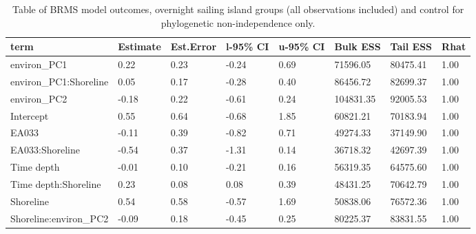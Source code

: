 \begin{table}[ht]
\centering
\begin{tabular}{p{3cm}p{1.35cm}p{1.35cm}p{1.35cm}p{1.35cm}p{1.35cm}p{1.35cm}p{1.35cm}}
  \toprule
term & Estimate & Est.Error & l-95\% CI & u-95\% CI & Bulk ESS & Tail ESS & Rhat \\ 
  \midrule
environ\_PC1 & 0.22 & 0.23 & -0.24 & 0.69 & 71596.05 & 80475.41 & 1.00 \\ 
  environ\_PC1:Shoreline & 0.05 & 0.17 & -0.28 & 0.40 & 86456.72 & 82699.37 & 1.00 \\ 
  environ\_PC2 & -0.18 & 0.22 & -0.61 & 0.24 & 104831.35 & 92005.53 & 1.00 \\ 
  Intercept & 0.55 & 0.64 & -0.68 & 1.85 & 60821.21 & 70183.94 & 1.00 \\ 
  EA033 & -0.11 & 0.39 & -0.82 & 0.71 & 49274.33 & 37149.90 & 1.00 \\ 
  EA033:Shoreline & -0.54 & 0.37 & -1.31 & 0.14 & 36718.32 & 42697.39 & 1.00 \\ 
  Time depth & -0.01 & 0.10 & -0.21 & 0.16 & 56319.35 & 64575.60 & 1.00 \\ 
  Time depth:Shoreline & 0.23 & 0.08 & 0.08 & 0.39 & 48431.25 & 70642.79 & 1.00 \\ 
  Shoreline & 0.54 & 0.58 & -0.57 & 1.69 & 50838.06 & 76572.36 & 1.00 \\ 
  Shoreline:environ\_PC2 & -0.09 & 0.18 & -0.45 & 0.25 & 80225.37 & 83831.55 & 1.00 \\ 
   \bottomrule
\end{tabular}
\caption{Table of BRMS model outcomes, overnight sailing island groups (all observations included) and control for phylogenetic non-independence only.} 
\label{BRMS_effects_SBZR_control_phylo}
\end{table}
